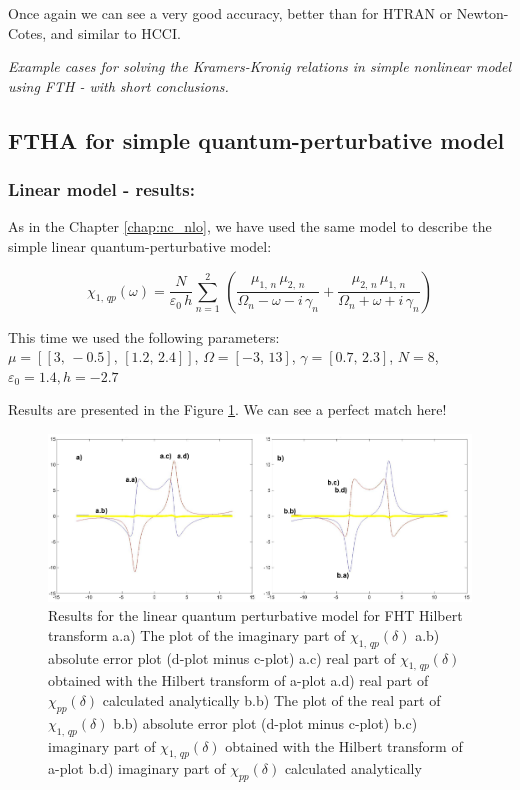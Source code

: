 \documentclass[12pt,twoside,a4paper]{article}
\numberwithin{equation}{subsection}
\numberwithin{figure}{subsection}
\begin{document}
Once again we can see a very good accuracy, better than for HTRAN or Newton-Cotes, and similar to HCCI.

\textit{Example cases for solving the Kramers-Kronig relations in simple nonlinear model using FTH - with short conclusions.}

\subsection{FTHA for simple quantum-perturbative model} \label{chap:hartley_quantum}

\subsubsection*{Linear model - results:}

As in the Chapter \ref{chap:nc_nlo}, we have used the same model to describe the simple linear quantum-perturbative model: 

\begin{equation} \label{eq:fht_qp}
  {\chi_{1, \,qp}}(\omega ) = \frac {N}{\varepsilon_0\,h} \sum_{n=1}^{2}\,(\frac {{\mu_{1, \,n}}\,{ \mu_{2, \,n}}}{{\Omega_{n}}
  - \omega  - i\,{\gamma_{n}}} + \frac {{\mu_{2, \,n}}\,{\mu_{1, \,n}}}{{\Omega_{n}} + \omega + i\,{\gamma_{n}}})
\end{equation}

This time we used the following parameters: \\
$\mu = [[3, \, - 0.5], \,[1.2, \,2.4]]$, 
$\Omega =[ - 3, \,13]$, 
$\gamma =[0.7, \,2.3]$,  
$N=8$, 
${\varepsilon_{0}}=1.4, 
h= - 2.7$

Results are presented in the Figure \ref{fig:fht_qp1}. We can see a perfect match here!

\begin{figure}
  \includegraphics[width=150mm]{img/fht_qp1.png}
  \caption{Results for the linear quantum perturbative model for FHT Hilbert transform
    a.a) The plot of the imaginary part of ${\chi_{1, \,qp}}(\delta )$
    a.b) absolute error plot (d-plot minus c-plot) 
    a.c) real part of ${\chi_{1, \,qp}}(\delta )$ obtained with the Hilbert transform of a-plot 
    a.d) real part of ${\chi_{pp}}(\delta )$ calculated analytically 
    b.b) The plot of the real part of ${\chi_{1, \,qp}}(\delta )$ 
    b.b) absolute error plot (d-plot minus c-plot) 
    b.c) imaginary part of ${\chi_{1, \,qp}}(\delta )$ obtained with the Hilbert transform of a-plot 
    b.d) imaginary part of ${\chi_{pp}}(\delta )$ calculated analytically  
    \label{fig:fht_qp1}
  }
\end{figure}
\end{document}
